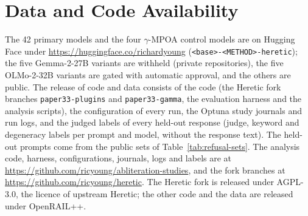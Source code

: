 \documentclass{article}
\begin{document}
\section*{Data and Code Availability}
The 42 primary models and the four $\gamma$-MPOA control models are on
Hugging Face under \url{https://huggingface.co/richardyoung}
(\texttt{<base>-<METHOD>-heretic}); the five Gemma-2-27B variants are
withheld (private repositories), the five OLMo-2-32B variants are gated with
automatic approval, and the others are public. The release of code and data consists of
the code (the Heretic fork branches \texttt{paper33-plugins} and
\texttt{paper33-gamma}, the evaluation harness and the analysis scripts), the
configuration of every run, the Optuna study journals and run logs, and the
judged labels of every held-out response (judge, keyword and degeneracy labels
per prompt and model, without the response text). The held-out prompts come
from the public sets of Table~\ref{tab:refusal-sets}. The analysis code,
harness, configurations, journals, logs and labels are at
\url{https://github.com/ricyoung/abliteration-studies}, and the fork branches
at \url{https://github.com/ricyoung/heretic}. The Heretic fork is released
under AGPL-3.0, the licence of upstream Heretic; the other code and the data
are released under OpenRAIL++.




\newpage
\appendix

\end{document}
